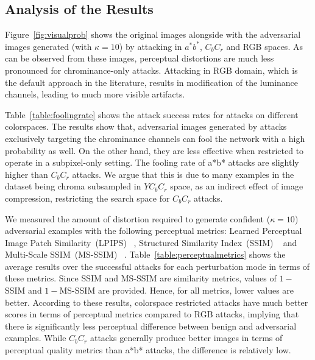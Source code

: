 \subsection{Analysis of the Results}
Figure~\ref{fig:visualprob} shows the original images alongside with the adversarial images generated (with \(\kappa = 10\)) by attacking in \(a^*b^*\), \(C_{b}C_{r}\) and RGB spaces. As can be observed from these images, perceptual distortions are much less pronounced for chrominance-only attacks. Attacking in RGB domain, which is the default approach in the literature, results in modification of the luminance channels, leading to much more visible artifacts.

Table~\ref*{table:foolingrate} shows the attack success rates for attacks on different colorspaces. The results show that, adversarial images generated by attacks exclusively targeting the chrominance channels can fool the network with a high probability as well. On the other hand, they are less effective when restricted to operate in a subpixel-only setting. The fooling rate of a*b* attacks are slightly higher than \(C_bC_r\) attacks. We argue that this is due to many examples in the dataset being chroma subsampled in \(YC_bC_r\) space, as an indirect effect of image compression, restricting the search space for \(C_bC_r\) attacks.

We measured the amount of distortion required to generate confident (\(\kappa = 10\)) adversarial examples with the following perceptual metrics: Learned Perceptual Image Patch Similarity~(LPIPS) ~\cite{zhang2018unreasonable}, Structured Similarity Index~(SSIM) ~\cite{wang2004image} and Multi-Scale SSIM~(MS-SSIM) ~\cite{wang2003multiscale}. Table~\ref{table:perceptualmetrics} shows the average results over the successful attacks for each perturbation mode in terms of these metrics. Since SSIM and MS-SSIM are similarity metrics, values of \(1-\)SSIM and \(1-\)MS-SSIM are provided. Hence, for all metrics, lower values are better. According to these results, colorspace restricted attacks have much better scores in terms of perceptual metrics compared to RGB attacks, implying that there is significantly less perceptual difference between benign and adversarial examples. While \(C_bC_r\) attacks generally produce better images in terms of perceptual quality metrics than a*b* attacks, the difference is relatively low.
